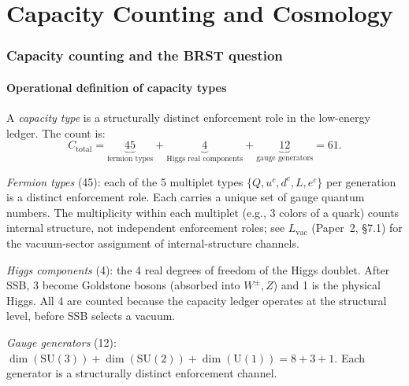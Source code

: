 \documentclass[11pt,a4paper]{article}
\theoremstyle{definition}
\newcommand{\SU}{\mathrm{SU}}
\newcommand{\U}{\mathrm{U}}
\begin{document}

\part{Capacity Counting and Cosmology}
\label{part:cosmo}


\section{Capacity counting and the BRST question}
\label{sec:capacity_count}


\subsection{Operational definition of capacity types}

A \emph{capacity type} is a structurally distinct enforcement role
in the low-energy ledger.  The count is:
\begin{equation}
  C_{\mathrm{total}} = \underbrace{45}_{\text{fermion types}}
    + \underbrace{4}_{\text{Higgs real components}}
    + \underbrace{12}_{\text{gauge generators}} = 61.
\end{equation}

\noindent\textit{Fermion types} (45): each of the 5 multiplet types
$\{Q, u^c, d^c, L, e^c\}$ per generation is a distinct enforcement
role.  Each carries a unique set of gauge quantum numbers.  The
multiplicity within each multiplet (e.g., 3 colors of a quark) counts
internal structure, not independent enforcement roles; see
$L_{\mathrm{vac}}$ (Paper~2, \S7.1) for the vacuum-sector assignment
of internal-structure channels.

\noindent\textit{Higgs components} (4): the 4 real degrees of freedom
of the Higgs doublet.  After SSB, 3 become Goldstone bosons (absorbed
into $W^\pm, Z$) and 1 is the physical Higgs.  All 4 are counted
because the capacity ledger operates at the structural level, before
SSB selects a vacuum.

\noindent\textit{Gauge generators} (12): $\dim(\SU(3)) + \dim(\SU(2))
+ \dim(\U(1)) = 8 + 3 + 1$.  Each generator is a structurally distinct
enforcement channel.
\end{document}
